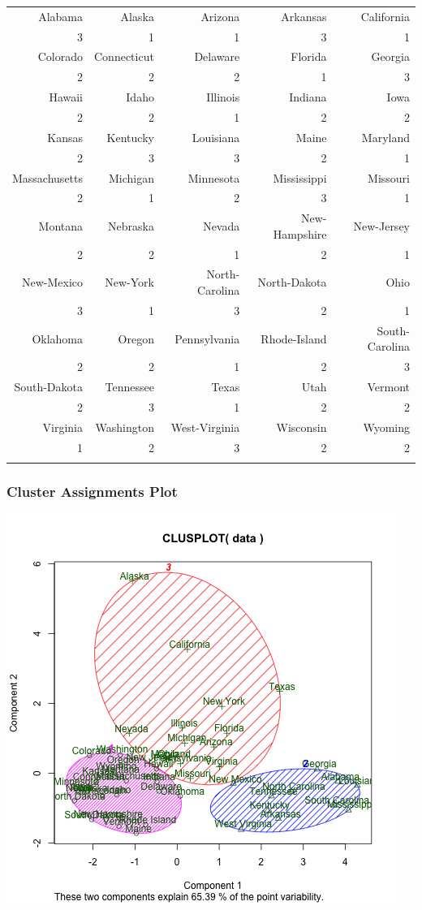 \documentclass[11pt]{article}
\begin{document}
\begin{center}
\begin{tabular}{rrrrr}
Alabama & Alaska & Arizona & Arkansas & California\\
3 & 1 & 1 & 3 & 1\\
Colorado & Connecticut & Delaware & Florida & Georgia\\
2 & 2 & 2 & 1 & 3\\
Hawaii & Idaho & Illinois & Indiana & Iowa\\
2 & 2 & 1 & 2 & 2\\
Kansas & Kentucky & Louisiana & Maine & Maryland\\
2 & 3 & 3 & 2 & 1\\
Massachusetts & Michigan & Minnesota & Mississippi & Missouri\\
2 & 1 & 2 & 3 & 1\\
Montana & Nebraska & Nevada & New-Hampshire & New-Jersey\\
2 & 2 & 1 & 2 & 1\\
New-Mexico & New-York & North-Carolina & North-Dakota & Ohio\\
3 & 1 & 3 & 2 & 1\\
Oklahoma & Oregon & Pennsylvania & Rhode-Island & South-Carolina\\
2 & 2 & 1 & 2 & 3\\
South-Dakota & Tennessee & Texas & Utah & Vermont\\
2 & 3 & 1 & 2 & 2\\
Virginia & Washington & West-Virginia & Wisconsin & Wyoming\\
1 & 2 & 3 & 2 & 2\\
 &  &  &  & \\
\end{tabular}
\end{center}
\subsubsection*{Cluster Assignments Plot}
\label{sec:orge1d668d}
\begin{center}
\includegraphics[width=.9\linewidth]{k-3-clusters.png}
\end{center}
\end{document}
